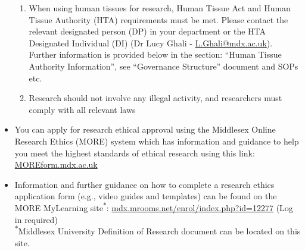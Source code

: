 \documentclass{MDXHandbook}
\begin{document}
\begin{itemize}
\begin{enumerate}
			\item When using human tissues for research, Human Tissue Act and Human Tissue Authority (HTA) requirements must be met. Please contact the relevant designated person (DP) in your department or the HTA Designated Individual (DI) (Dr Lucy Ghali - \href{mailto:L.Ghali@mdx.ac.uk}{L.Ghali@mdx.ac.uk}). Further information is provided below in the section: ``Human Tissue Authority Information'', see ``Governance Structure'' document and SOPs etc.
			\item Research should not involve any illegal activity, and researchers must comply with all relevant laws
		\end{enumerate}
	\item You can apply for research ethical approval using the Middlesex Online Research Ethics (MORE) system which has information and guidance to help you meet the highest standards of ethical research using this link: \url{MOREform.mdx.ac.uk}
	\item Information and further guidance on how to complete a research ethics application form (e.g., video guides and templates) can be found on the MORE MyLearning site\textsuperscript{$\ast$}: \url{mdx.mrooms.net/enrol/index.php?id=12277} (Log in required)\\ 
 \textsuperscript{$\ast$}Middlesex University Definition of Research document can be located on this site.
\end{itemize}
\end{document}
